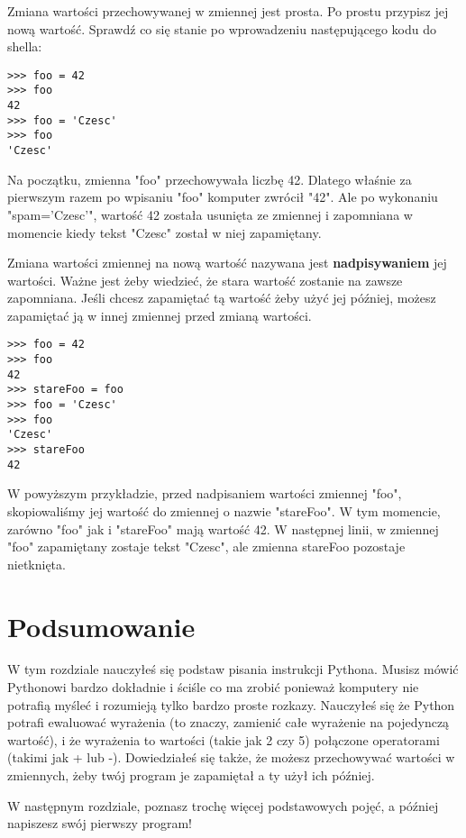 \documentclass{book}
\begin{document}
Zmiana wartości przechowywanej w zmiennej jest prosta. Po prostu przypisz jej nową wartość. Sprawdź co się stanie po wprowadzeniu następującego kodu do shella:

\begin{lstlisting}
>>> foo = 42
>>> foo
42
>>> foo = 'Czesc'
>>> foo
'Czesc'
\end{lstlisting}

Na początku, zmienna "foo" przechowywała liczbę 42. Dlatego właśnie za pierwszym razem po wpisaniu "foo" komputer zwrócił "42". Ale po wykonaniu "spam='Czesc'", wartość 42 została usunięta ze zmiennej i zapomniana w momencie kiedy tekst "Czesc" został w niej zapamiętany.

Zmiana wartości zmiennej na nową wartość nazywana jest {\bf nadpisywaniem} jej wartości. Ważne jest żeby wiedzieć, że stara wartość zostanie na zawsze zapomniana. Jeśli chcesz zapamiętać tą wartość żeby użyć jej później, możesz zapamiętać ją w innej zmiennej przed zmianą wartości.

\begin{lstlisting}
>>> foo = 42
>>> foo
42
>>> stareFoo = foo
>>> foo = 'Czesc'
>>> foo
'Czesc'
>>> stareFoo
42
\end{lstlisting}

W powyższym przykładzie, przed nadpisaniem wartości zmiennej "foo", skopiowaliśmy jej wartość do zmiennej o nazwie "stareFoo". W tym momencie, zarówno "foo" jak i "stareFoo" mają wartość 42. W następnej linii, w zmiennej "foo" zapamiętany zostaje tekst "Czesc", ale zmienna stareFoo pozostaje nietknięta.

\section{Podsumowanie}

W tym rozdziale nauczyłeś się podstaw pisania instrukcji Pythona. Musisz mówić Pythonowi bardzo dokładnie i ściśle co ma zrobić ponieważ komputery nie potrafią myśleć i rozumieją tylko bardzo proste rozkazy. Nauczyłeś się że Python potrafi ewaluować wyrażenia (to znaczy, zamienić całe wyrażenie na pojedynczą wartość), i że wyrażenia to wartości (takie jak 2 czy 5) połączone operatorami (takimi jak + lub -). Dowiedziałeś się także, że możesz przechowywać wartości w zmiennych, żeby twój program je zapamiętał a ty użył ich później.

W następnym rozdziale, poznasz trochę więcej podstawowych pojęć, a później napiszesz swój pierwszy program!
\end{document}
